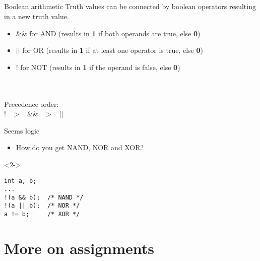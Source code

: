 \subsection{}
\begin{frame}{Boolean arithmetic}
	Truth values can be connected by boolean operators resulting in a new truth value.
	\begin{itemize}
		\item \&\& for AND (results in \textbf{1} if both operands are true, else \textbf{0})
		\item $||$ for OR (results in \textbf{1} if at least one operator is true, else \textbf{0})
		\item ! for NOT (results in \textbf{1} if the operand is false, else \textbf{0})
	\end{itemize}
	\ \\\ \\Precedence order:\\
	\centering
	! \ $>$ \ \&\& \ $>$ \ $||$ 
\end{frame}
\begin{frame}[fragile]{Seems logic}
	\begin{itemize}
		\item How do you get NAND, NOR and XOR?
	\end{itemize}
	\begin{uncoverenv}<2->
		\begin{lstlisting}[numbers=none]
int a, b;
...
!(a && b);	/* NAND */
!(a || b);	/* NOR */
a != b;		/* XOR */
\end{lstlisting}
	\end{uncoverenv}
\end{frame}
\section{More on assignments}
